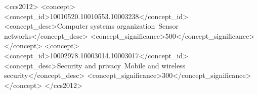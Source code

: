 \documentclass{sig-alternate-05-2015}
\begin{document}
%
%
\begin{CCSXML}
<ccs2012>
<concept>
<concept_id>10010520.10010553.10003238</concept_id>
<concept_desc>Computer systems organization~Sensor networks</concept_desc>
<concept_significance>500</concept_significance>
</concept>
<concept>
<concept_id>10002978.10003014.10003017</concept_id>
<concept_desc>Security and privacy~Mobile and wireless security</concept_desc>
<concept_significance>300</concept_significance>
</concept>
</ccs2012>  
\end{CCSXML}



%
%

%
%
\printccsdesc


\end{document}

